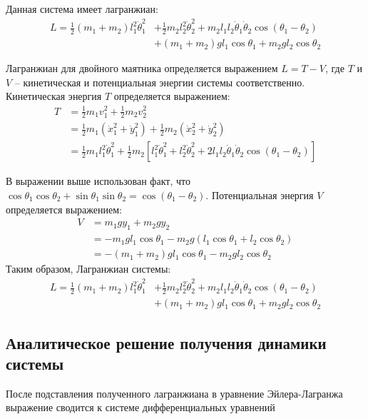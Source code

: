 \documentclass[12pt]{article}
\begin{document}
Данная система имеет лагранжиан:
$$
\begin{aligned}
L=\frac{1}{2}\left(m_{1}+m_{2}\right) l_{1}^{2} \dot{\theta}_{1}^{2} &+\frac{1}{2} m_{2} l_{2}^{2} \dot{\theta}_{2}^{2}+m_{2} l_{1} l_{2} \dot{\theta}_{1} \dot{\theta}_{2} \cos \left(\theta_{1}-\theta_{2}\right) \\
&+\left(m_{1}+m_{2}\right) g l_{1} \cos \theta_{1}+m_{2} g l_{2} \cos \theta_{2}
\end{aligned}
$$

Лагранжиан для двойного маятника определяется выражением $L=T - V$, где $T$ и $V$ -- кинетическая и потенциальная энергии системы соответственно. Кинетическая энергия $T$ определяется выражением:
$$
\begin{aligned}
T &=\frac{1}{2} m_{1} v_{1}^{2}+\frac{1}{2} m_{2} v_{2}^{2} \\
&=\frac{1}{2} m_{1}\left(\dot{x}_{1}^{2}+\dot{y}_{1}^{2}\right)+\frac{1}{2} m_{2}\left(\dot{x}_{2}^{2}+\dot{y}_{2}^{2}\right) \\
&=\frac{1}{2} m_{1} l_{1}^{2} \dot{\theta}_{1}^{2}+\frac{1}{2} m_{2}\left[l_{1}^{2} \dot{\theta}_{1}^{2}+l_{2}^{2} \dot{\theta}_{2}^{2}+2 l_{1} l_{2} \dot{\theta}_{1} \dot{\theta}_{2} \cos \left(\theta_{1}-\theta_{2}\right)\right]
\end{aligned}
$$

В выражении выше использован факт, что $\cos \theta_{1} \cos \theta_{2}+\sin \theta_{1} \sin \theta_{2}=\cos \left(\theta_{1}-\theta_{2}\right)$. Потенциальная энергия $V$ определяется выражением:
$$
\begin{aligned}
V &=m_{1} g y_{1}+m_{2} g y_{2} \\
&=-m_{1} g l_{1} \cos \theta_{1}-m_{2} g\left(l_{1} \cos \theta_{1}+l_{2} \cos \theta_{2}\right) \\
&=-\left(m_{1}+m_{2}\right) g l_{1} \cos \theta_{1}-m_{2} g l_{2} \cos \theta_{2}
\end{aligned}
$$
Таким образом, Лагранжиан системы:
$$
\begin{aligned}
L=\frac{1}{2}\left(m_{1}+m_{2}\right) l_{1}^{2} \dot{\theta}_{1}^{2} &+\frac{1}{2} m_{2} l_{2}^{2} \dot{\theta}_{2}^{2}+m_{2} l_{1} l_{2} \dot{\theta}_{1} \dot{\theta}_{2} \cos \left(\theta_{1}-\theta_{2}\right) \\
&+\left(m_{1}+m_{2}\right) g l_{1} \cos \theta_{1}+m_{2} g l_{2} \cos \theta_{2}
\end{aligned}
$$


\subsection{Аналитическое решение получения динамики системы}
После подставления полученного лагранжиана в уравнение Эйлера-Лагранжа выражение сводится к системе дифференциальных уравнений \cite{double_pendulum}
\end{document}
